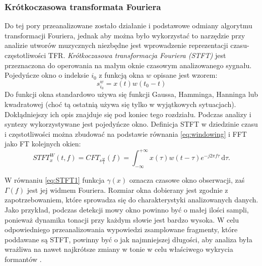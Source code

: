 \documentclass[12pt,a4paper,twoside]{mwart}
\begin{document}
\subsubsection{Krótkoczasowa transformata Fouriera}\label{sec:STFT}
Do tej pory przeanalizowane zostało działanie i podstawowe odmiany algorytmu transformacji Fouriera, jednak aby można było wykorzystać to narzędzie przy analizie utworów muzycznych niezbędne jest wprowadzenie reprezentacji czasu-częstotliwości TFR. \textit{Krótkoczasowa transformacja Fouriera (STFT)} jest przeznaczona do operowania na małym oknie czasowym analizowanego sygnału. Pojedyńcze okno o indeksie $i_0$ z funkcją okna $w$ opisane jest wzorem:
\begin{equation} \label{eq:windowing}
  s_{i_0}^w = x(t)w(t_0 - t)
\end{equation}
Do funkcji okna standardowo używa się funkcji Gaussa, Hamminga, Hanninga lub kwadratowej (choć tą ostatnią używa się tylko w wyjątkowych sytuacjach). Dokłądniejszy ich opis znajduje się pod koniec tego rozdziału. Podczas analizy i syntezy wykorzystywane jest pojedyńcze okno. Definicja STFT w dziedzinie czasu i częstotliwości można zbudować na podstawie równania \ref{eq:windowing} i FFT jako FT kolejnych okien:
\begin{equation} \label{eq:STFT1}
  STFT^{W}_{x}(t,f) = CFT_{s \frac{w}{t}}(f) = \int_{-\infty}^{+\infty} x(\tau)w(t - \tau)e^{-j2\pi f\tau}  \,\mathrm{d}\tau.
\end{equation}

W równaniu \ref{eq:STFT1} funkcja $\gamma(x)$ oznacza czasowe okno obserwacji, zaś $\Gamma(f)$ jest jej widmem Fouriera. Rozmiar okna dobierany jest zgodnie z zapotrzebowaniem, które sprowadza się do charakterystyki analizowanych danych. Jako przykład, podczas detekcji mowy okno powinno być o małej ilości sampli, ponieważ dynamika tonacji przy każdym słowie jest bardzo wysoka. W celu odpowiedniego przeanalizowania wypowiedzi zsamplowane fragmenty, które poddawane są STFT, powinny być o jak najmniejszej długości, aby analiza była wrażliwa na nawet najkrótsze zmiany w tonie w celu właściwego wykrycia formantów 
\cite[804–805]{Transcription:Klapuri:MultipleFundamentalFrequencyEstimation}
.
\end{document}
